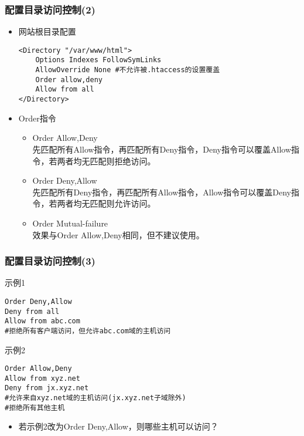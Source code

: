 \documentclass[xcolor=svgnames,presentation]{beamer}
\begin{document}
\begin{frame}[fragile]
\frametitle{配置目录访问控制(2)}
\label{sec-1-12}
\begin{itemize}

\item 网站根目录配置\\
\label{sec-1-12-1}%
\begin{verbatim}
<Directory "/var/www/html">
    Options Indexes FollowSymLinks
    AllowOverride None #不允许被.htaccess的设置覆盖
    Order allow,deny
    Allow from all
</Directory>
\end{verbatim}

\item Order指令
\label{sec-1-12-2}%
\begin{itemize}

\item Order Allow,Deny\\
\label{sec-1-12-2-1}%
先匹配所有Allow指令，再匹配所有Deny指令，Deny指令可以覆盖Allow指令，若两者均无匹配则拒绝访问。

\item Order Deny,Allow\\
\label{sec-1-12-2-2}%
先匹配所有Deny指令，再匹配所有Allow指令，Allow指令可以覆盖Deny指令，若两者均无匹配则允许访问。

\item Order Mutual-failure\\
\label{sec-1-12-2-3}%
效果与Order Allow,Deny相同，但不建议使用。
\end{itemize} %
\end{itemize} %
\end{frame}
\begin{frame}[fragile]
\frametitle{配置目录访问控制(3)}
\label{sec-1-13}
\begin{exampleblock}{示例1}
\label{sec-1-13-1}


\begin{verbatim}
Order Deny,Allow
Deny from all
Allow from abc.com
#拒绝所有客户端访问，但允许abc.com域的主机访问
\end{verbatim}
\end{exampleblock}
\begin{block}{示例2}
\label{sec-1-13-2}


\begin{verbatim}
Order Allow,Deny
Allow from xyz.net
Deny from jx.xyz.net
#允许来自xyz.net域的主机访问(jx.xyz.net子域除外)
#拒绝所有其他主机
\end{verbatim}
\end{block}
\begin{itemize}

\item 若示例2改为Order Deny,Allow，则哪些主机可以访问？
\label{sec-1-13-3}%
\end{itemize} %
\end{frame}
\end{document}
